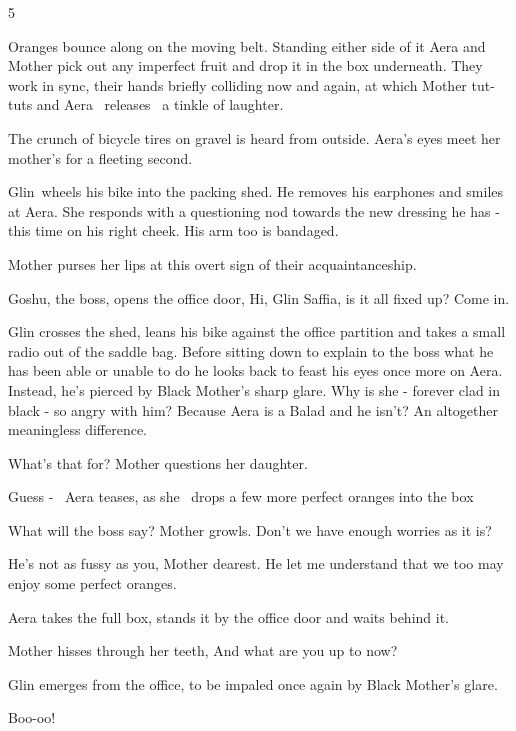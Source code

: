 \documentclass[letterpaper]{article}
\begin{document}
\bigskip

5 

Oranges bounce along on the moving belt. Standing either side of it Aera and Mother pick out any imperfect fruit and
drop it in the box underneath. They work in sync, their hands briefly colliding now and again, at which Mother tut-tuts
and Aera \ releases \ a tinkle of laughter. 

The crunch of bicycle tires on gravel is heard from outside. Aera's eyes meet her mother's for a fleeting second. 

Glin~wheels his bike into the packing shed. He removes his earphones and smiles at Aera. She responds with a questioning
nod towards the new dressing he has - this time on his right cheek. His arm too is bandaged. 

Mother purses her lips at this overt sign of their acquaintanceship.~~~~~~~ 

Goshu, the boss, opens the office door, {\textquotedbl}Hi, Glin Saffia, is it all fixed up? Come in.{\textquotedbl}

Glin crosses the shed, leans his bike against the office partition and takes a small radio out of the saddle bag. Before
sitting down to explain to the boss what he has been able or unable to do he looks back to feast his eyes once more on
Aera. Instead, he's pierced by Black Mother's sharp glare. Why is she - forever clad in black - so angry with him?
Because Aera is a Balad and he isn't? An altogether meaningless difference.

{\textquotedbl}What's that for?{\textquotedbl} Mother questions her daughter.

{\textquotedbl}Guess -{\textquotedbl}~ Aera teases, as she \ drops a few more perfect oranges into the box

{\textquotedbl}What will the boss say?{\textquotedbl} Mother growls. {\textquotedbl}Don't we have enough worries as it
is?{\textquotedbl} 

{\textquotedbl}He's not as fussy as you, Mother dearest. He let me understand that we too may enjoy some perfect
oranges.{\textquotedbl} 

Aera takes the full box, stands it by the office door and waits behind it.

Mother hisses through her teeth, {\textquotedbl}And what are you up to now?{\textquotedbl}

Glin emerges from the office, to be impaled once again by Black Mother's glare. 

{\textquotedbl}Boo-oo!{\textquotedbl}
\end{document}
